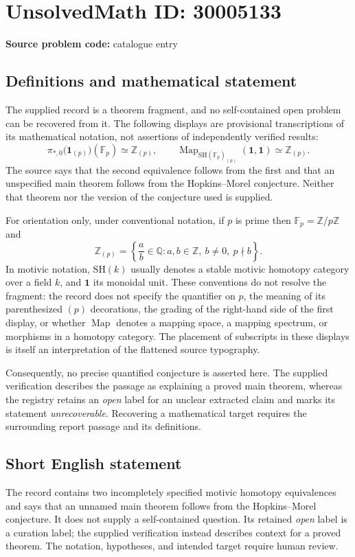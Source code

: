 \documentclass[11pt]{article}
\newcommand{\Z}{\mathbb{Z}}
\newcommand{\Q}{\mathbb{Q}}
\newcommand{\F}{\mathbb{F}}
\begin{document}
\section*{UnsolvedMath ID: 30005133}
\textbf{Source problem code:} catalogue entry
\subsection{Definitions and mathematical statement}
The supplied record is a theorem fragment, and no self-contained open problem can be recovered from it. The following displays are provisional transcriptions of its mathematical notation, not assertions of independently verified results:
\[
\pi_{*,0}\bigl(\mathbf{1}_{(p)}\bigr)(\F_p)\simeq\Z_{(p)},
\qquad
\operatorname{Map}_{\mathrm{SH}(\F_p)_{(p)}}(\mathbf{1},\mathbf{1})\simeq\Z_{(p)}.
\]
The source says that the second equivalence follows from the first and that an unspecified main theorem follows from the Hopkins--Morel conjecture. Neither that theorem nor the version of the conjecture used is supplied.

For orientation only, under conventional notation, if \(p\) is prime then \(\F_p=\Z/p\Z\) and
\[
\Z_{(p)}=\left\{\frac{a}{b}\in\Q: a,b\in\Z,\ b\ne0,\ p\nmid b\right\}.
\]
In motivic notation, \(\mathrm{SH}(k)\) usually denotes a stable motivic homotopy category over a field \(k\), and \(\mathbf{1}\) its monoidal unit. These conventions do not resolve the fragment: the record does not specify the quantifier on \(p\), the meaning of its parenthesized \((p)\) decorations, the grading of the right-hand side of the first display, or whether \(\operatorname{Map}\) denotes a mapping space, a mapping spectrum, or morphisms in a homotopy category. The placement of subscripts in these displays is itself an interpretation of the flattened source typography.

Consequently, no precise quantified conjecture is asserted here. The supplied verification describes the passage as explaining a proved main theorem, whereas the registry retains an \emph{open} label for an unclear extracted claim and marks its statement \emph{unrecoverable}. Recovering a mathematical target requires the surrounding report passage and its definitions.
\subsection{Short English statement}
The record contains two incompletely specified motivic homotopy equivalences and says that an unnamed main theorem follows from the Hopkins--Morel conjecture. It does not supply a self-contained question. Its retained \emph{open} label is a curation label; the supplied verification instead describes context for a proved theorem. The notation, hypotheses, and intended target require human review.
\end{document}
